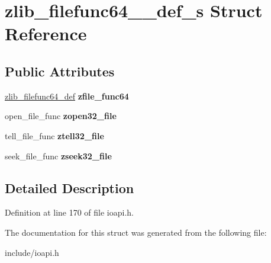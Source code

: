 \hypertarget{structzlib__filefunc64__32__def__s}{\section{zlib\-\_\-filefunc64\-\_\-\_\-def\-\_\-s Struct Reference}
\label{structzlib__filefunc64__32__def__s}
}
\subsection*{Public Attributes}
\begin{DoxyCompactItemize}
\item 
\hypertarget{structzlib__filefunc64__32__def__s_a5b05687723a1a8cd310a73ab62fc31f5}{\hyperlink{structzlib__filefunc64__def__s}{zlib\-\_\-filefunc64\-\_\-def} {\bfseries zfile\-\_\-func64}}\label{structzlib__filefunc64__32__def__s_a5b05687723a1a8cd310a73ab62fc31f5}

\item 
\hypertarget{structzlib__filefunc64__32__def__s_a784a1cead2df16b1ce5881f32236308a}{open\-\_\-file\-\_\-func {\bfseries zopen32\-\_\-file}}\label{structzlib__filefunc64__32__def__s_a784a1cead2df16b1ce5881f32236308a}

\item 
\hypertarget{structzlib__filefunc64__32__def__s_a8ef46da9e69697b4f13cd611523761a8}{tell\-\_\-file\-\_\-func {\bfseries ztell32\-\_\-file}}\label{structzlib__filefunc64__32__def__s_a8ef46da9e69697b4f13cd611523761a8}

\item 
\hypertarget{structzlib__filefunc64__32__def__s_a2c6e18405ec9c8b2d482055e9bf06766}{seek\-\_\-file\-\_\-func {\bfseries zseek32\-\_\-file}}\label{structzlib__filefunc64__32__def__s_a2c6e18405ec9c8b2d482055e9bf06766}

\end{DoxyCompactItemize}


\subsection{Detailed Description}


Definition at line 170 of file ioapi.\-h.



The documentation for this struct was generated from the following file\-:\begin{DoxyCompactItemize}
\item 
include/ioapi.\-h\end{DoxyCompactItemize}
